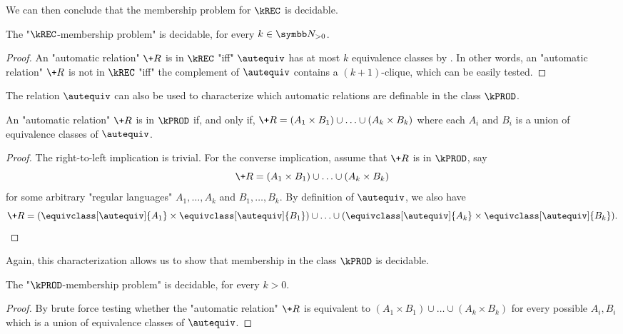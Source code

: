 We can then conclude that the membership problem for $\kREC$ is decidable. 

\begin{corollary}
    The "$\kREC$-membership problem" is decidable, for every $k \in \Np$.
\end{corollary}
\begin{proof}
    An "automatic relation" $\+R$ is in $\kREC$ "iff" $\autequiv$ has at most $k$ equivalence classes by . 
    In other words, an "automatic relation" $\+R$ is not in $\kREC$ "iff" the complement of $\autequiv$ contains a $(k+1)$-clique, which can be easily tested.
\end{proof}

The relation $\autequiv$ can also be used to characterize which automatic relations are definable in the class $\kPROD$.

\begin{proposition}
    An "automatic relation" $\+R$ is in $\kPROD$ if, and only if, $\+R=(A_1 \times B_1) \cup \dotsc \cup (A_k \times B_k)$ where each $A_i$ and $B_i$ is a union of equivalence classes of $\autequiv$.
\end{proposition}
\begin{proof}
    The right-to-left implication is trivial. For the converse implication,
    assume that $\+R$ is in $\kPROD$, say
    \[
        \+R=(A_1 \times B_1) \cup \dotsc \cup (A_k \times B_k)
    \]
    for some arbitrary "regular languages" $A_1,\dotsc,A_k$ and $B_1,\dotsc,B_k$.
    By definition of $\autequiv$, we also have
    \[
        \+R=(\equivclass[\autequiv]{A_1} \times \equivclass[\autequiv]{B_1})
        \cup \dotsc \cup (\equivclass[\autequiv]{A_k} \times \equivclass[\autequiv]{B_k}).\qedhere
    \]
\end{proof}

Again, this characterization allows us to show that membership in the class $\kPROD$ is decidable. 

\begin{corollary}
    The "$\kPROD$-membership problem" is decidable, for every $k > 0$.
\end{corollary}

\begin{proof}
    By brute force testing whether the "automatic relation" $\+R$ is equivalent to $(A_1 \times B_1) \cup \dotsc \cup (A_k \times B_k)$ for every possible $A_i,B_i$ which is a union of equivalence classes of $\autequiv$.
\end{proof}
